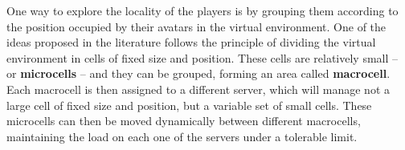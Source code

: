
One way to explore the locality of the players is by grouping them according to the position occupied by their avatars in the virtual environment. %
%
%
%
%
One of the ideas proposed in the literature \cite{devleeschauwer2005dma} follows the principle of dividing the virtual environment in cells of fixed size and position. These cells are relatively small -- or \textbf{microcells} -- and they can be grouped, forming an area called \textbf{macrocell}. Each macrocell is then assigned to a different server, which will manage not a large cell of fixed size and position, but a variable set of small cells. These microcells can then be moved dynamically between different macrocells, maintaining the load on each one of the servers under a tolerable limit.

